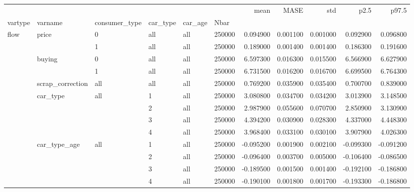 \begin{tabular}{llllllrrrrr}
\toprule
 &  &  &  &  &  & mean & MASE & std & p2.5 & p97.5 \\
vartype & varname & consumer_type & car_type & car_age & Nbar &  &  &  &  &  \\
\midrule
\multirow[t]{13}{*}{flow} & \multirow[t]{2}{*}{price} & 0 & all & all & 250000 & 0.094900 & 0.001100 & 0.001000 & 0.092900 & 0.096800 \\
\cline{3-11} \cline{4-11} \cline{5-11}
 &  & 1 & all & all & 250000 & 0.189000 & 0.001400 & 0.001400 & 0.186300 & 0.191600 \\
\cline{2-11} \cline{3-11} \cline{4-11} \cline{5-11}
 & \multirow[t]{2}{*}{buying} & 0 & all & all & 250000 & 6.597300 & 0.016300 & 0.015500 & 6.566900 & 6.627900 \\
\cline{3-11} \cline{4-11} \cline{5-11}
 &  & 1 & all & all & 250000 & 6.731500 & 0.016200 & 0.016700 & 6.699500 & 6.764300 \\
\cline{2-11} \cline{3-11} \cline{4-11} \cline{5-11}
 & scrap_correction & all & all & all & 250000 & 0.769200 & 0.035900 & 0.035400 & 0.700700 & 0.839000 \\
\cline{2-11} \cline{3-11} \cline{4-11} \cline{5-11}
 & \multirow[t]{4}{*}{car_type} & \multirow[t]{4}{*}{all} & 1 & all & 250000 & 3.080800 & 0.034700 & 0.034200 & 3.013900 & 3.148500 \\
\cline{4-11} \cline{5-11}
 &  &  & 2 & all & 250000 & 2.987900 & 0.055600 & 0.070700 & 2.850900 & 3.130900 \\
\cline{4-11} \cline{5-11}
 &  &  & 3 & all & 250000 & 4.394200 & 0.030900 & 0.028300 & 4.337000 & 4.448300 \\
\cline{4-11} \cline{5-11}
 &  &  & 4 & all & 250000 & 3.968400 & 0.033100 & 0.030100 & 3.907900 & 4.026300 \\
\cline{2-11} \cline{3-11} \cline{4-11} \cline{5-11}
 & \multirow[t]{4}{*}{car_type_age} & \multirow[t]{4}{*}{all} & 1 & all & 250000 & -0.095200 & 0.001900 & 0.002100 & -0.099300 & -0.091200 \\
\cline{4-11} \cline{5-11}
 &  &  & 2 & all & 250000 & -0.096400 & 0.003700 & 0.005000 & -0.106400 & -0.086500 \\
\cline{4-11} \cline{5-11}
 &  &  & 3 & all & 250000 & -0.189500 & 0.001500 & 0.001400 & -0.192100 & -0.186800 \\
\cline{4-11} \cline{5-11}
 &  &  & 4 & all & 250000 & -0.190100 & 0.001800 & 0.001700 & -0.193300 & -0.186800 \\
\cline{1-11} \cline{2-11} \cline{3-11} \cline{4-11} \cline{5-11}

\end{tabular}
